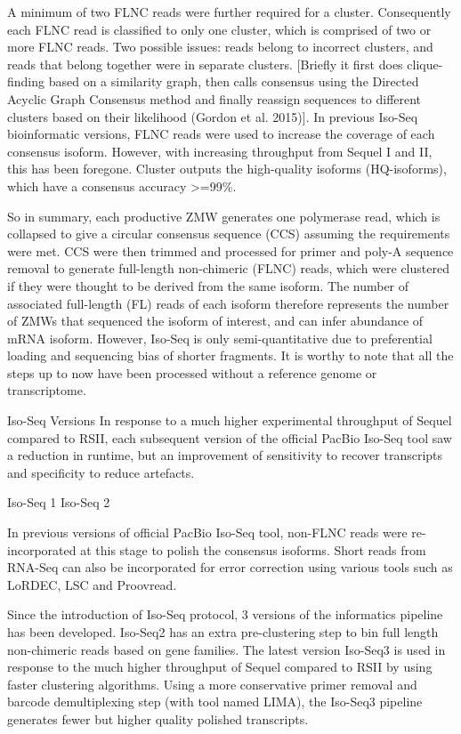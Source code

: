 A minimum of two FLNC reads were further required for a cluster. Consequently each FLNC read is classified to only one cluster, which is comprised of two or more FLNC reads. Two possible issues: reads belong to incorrect clusters, and reads that belong together were in separate clusters. [Briefly it first does clique-finding based on a similarity graph, then calls consensus using the Directed Acyclic Graph Consensus method and finally reassign sequences to different clusters based on their likelihood (Gordon et al. 2015)]. In previous Iso-Seq bioinformatic versions, FLNC reads were used to increase the coverage of each consensus isoform. However, with increasing throughput from Sequel I and II, this has been foregone. Cluster outputs the high-quality isoforms (HQ-isoforms), which have a consensus accuracy >=99\%. 

So in summary, each productive ZMW generates one polymerase read, which is collapsed to give a circular consensus sequence (CCS) assuming the requirements were met. CCS were then trimmed and processed for primer and poly-A sequence removal to generate full-length non-chimeric (FLNC) reads, which were clustered if they were thought to be derived from the same isoform. The number of associated full-length (FL) reads of each isoform therefore represents the number of ZMWs that sequenced the isoform of interest, and can infer abundance of mRNA isoform. However, Iso-Seq is only semi-quantitative due to preferential loading and sequencing bias of shorter fragments. It is worthy to note that all the steps up to now have been processed without a reference genome or transcriptome. 


Iso-Seq Versions 
In response to a much higher experimental throughput of Sequel compared to RSII, each subsequent   version of the official PacBio Iso-Seq tool saw a reduction in runtime, but an improvement of sensitivity to recover transcripts and specificity to reduce artefacts.

Iso-Seq 1 	
Iso-Seq 2	


In previous versions of official PacBio Iso-Seq tool, non-FLNC reads were re-incorporated at this stage to polish the consensus isoforms. Short reads from RNA-Seq can also be incorporated for error correction using various tools such as LoRDEC, LSC and Proovread. 

Since the introduction of Iso-Seq protocol, 3 versions of the informatics pipeline has been developed. Iso-Seq2 has an extra pre-clustering step to bin full length non-chimeric reads based on gene families. The latest version Iso-Seq3 is used in response to the much higher throughput of Sequel compared to RSII by using faster clustering algorithms. Using a more conservative primer removal and barcode demultiplexing step (with tool named LIMA), the Iso-Seq3 pipeline generates fewer but higher quality polished transcripts. 

